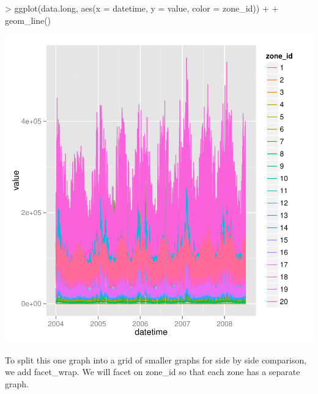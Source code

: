 \documentclass{article}
\begin{document}
\begin{Schunk}
\begin{Sinput}
> ggplot(data.long, aes(x = datetime, y = value, color = zone_id)) +
+ geom_line()
\end{Sinput}
\end{Schunk}
\includegraphics{cookbook-040}

To split this one graph into a grid of smaller graphs for side by side
comparison, we add facet\_wrap.  We will facet on zone\_id so that each
zone has a separate graph.
\end{document}
